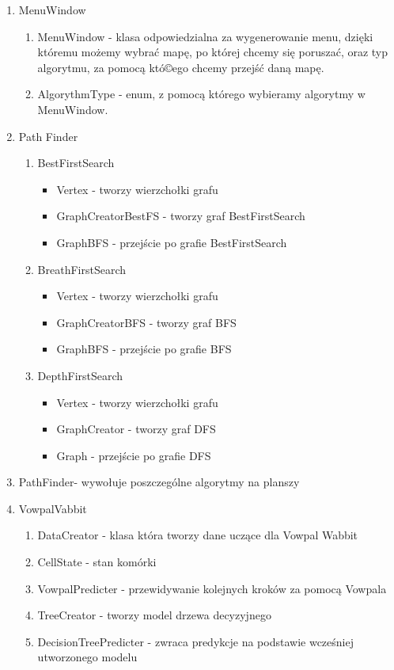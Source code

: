 \documentclass[12pt]{article}
\begin{document}
\begin{enumerate}
	\item MenuWindow
    		\begin{enumerate}[label=(\roman*)]
		\item MenuWindow - klasa odpowiedzialna za wygenerowanie menu, dzięki któremu możemy wybrać mapę, po której chcemy się poruszać, oraz typ algorytmu, za pomocą któ©ego chcemy przejść daną mapę.
		\item AlgorythmType - enum, z pomocą którego wybieramy algorytmy w MenuWindow.
		\end{enumerate}
	\item Path Finder
    		\begin{enumerate}[label=(\roman*)]
		\item BestFirstSearch
			\begin{itemize}
			\item Vertex - tworzy wierzchołki grafu
			\item GraphCreatorBestFS - tworzy graf BestFirstSearch
			\item GraphBFS - przejście po grafie BestFirstSearch
			\end{itemize}
		\item BreathFirstSearch
			\begin{itemize}
			\item Vertex - tworzy wierzchołki grafu
			\item GraphCreatorBFS - tworzy graf BFS
			\item GraphBFS - przejście po grafie BFS
			\end{itemize}
		\item DepthFirstSearch
			\begin{itemize}
			\item Vertex - tworzy wierzchołki grafu
			\item GraphCreator - tworzy graf DFS
			\item Graph - przejście po grafie DFS
			\end{itemize}
		\end{enumerate}
	\item PathFinder- wywołuje poszczególne algorytmy na planszy
	\item VowpalVabbit
		\begin{enumerate}[label=(\roman*)]
		\item DataCreator - klasa która tworzy dane uczące dla Vowpal Wabbit
		\item CellState - stan komórki
		\item VowpalPredicter - przewidywanie kolejnych kroków za pomocą Vowpala
		\item TreeCreator - tworzy model drzewa decyzyjnego 
		\item DecisionTreePredicter - zwraca predykcje na podstawie wcześniej utworzonego modelu
		\end{enumerate}
\end{enumerate}
\newpage 
\end{document}
